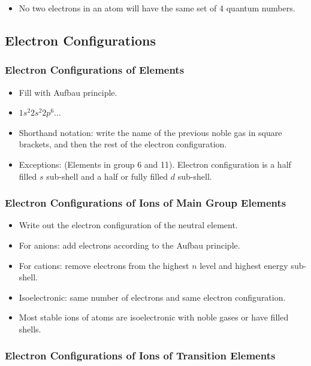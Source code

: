 \documentclass{article}
\begin{document}
\begin{itemize}
    \item No two electrons in an atom will have the same set of 4 quantum numbers.
\end{itemize}

\subsection{Electron Configurations}

\subsubsection{Electron Configurations of Elements}

\begin{itemize}
    \item Fill with Aufbau principle.
    \item $1s^2 2s^2 2p^6 ...$
    \item Shorthand notation: write the name of the previous noble gas in square brackets, and then the rest of the electron configuration.
    \item Exceptions:  (Elements in group 6 and 11). Electron configuration is a half filled $s$ sub-shell and a half or fully filled $d$ sub-shell.
\end{itemize}

\subsubsection{Electron Configurations of Ions of Main Group Elements}

\begin{itemize}
    \item Write out the electron configuration of the neutral element.
    \item For anions: add electrons according to the Aufbau principle.
    \item For cations: remove electrons from the highest $n$ level and highest energy sub-shell.
    \item Isoelectronic: same number of electrons and same electron configuration.
    \item Most stable ions of atoms are isoelectronic with noble gases or have filled shells.
\end{itemize}

\subsubsection{Electron Configurations of Ions of Transition Elements}
\end{document}
